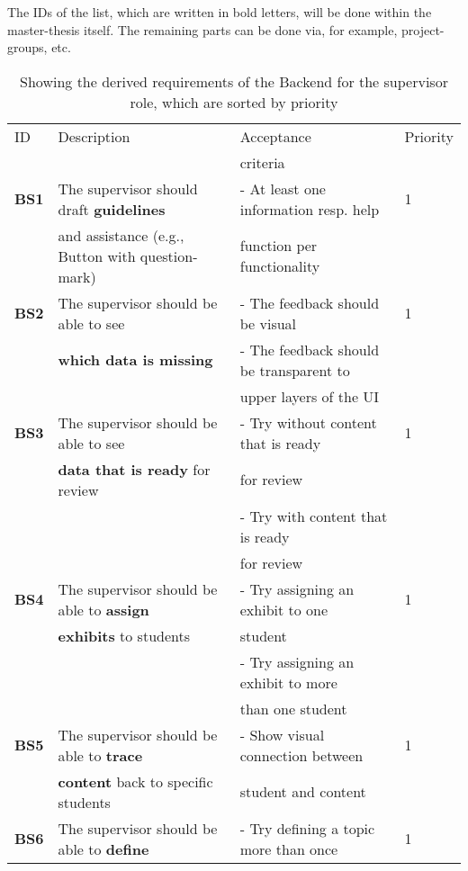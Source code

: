 \documentclass[twoside,openright,fleqn,pointlessnumbers,headinclude,,11pt,a4paper,BCOR5mm,footinclude,cleardoubleempty,abstracton %
                ]{scrreprt}
\begin{document}
The IDs of the list, which are written in bold letters, will be done within the master-thesis itself. The remaining parts can be done via, for example,
project-groups, etc. 

	\begin{table}[h]
		\caption{Showing the derived requirements of the Backend for the supervisor role, which are sorted by priority}
	\begin{tabular}{llll}
	\hline
	ID 	& Description 	& Acceptance 	& Priority \\
	 	& 			 & criteria 	&  \\
		\hline
	\textbf{BS1} 	& The supervisor should draft \textbf{guidelines} 		& - At least one information resp. help 	& 1	\\
	 		& and assistance (e.g., Button with question-mark)		& function per functionality 			& 		\\
	\hline
	\textbf{BS2} 	& The supervisor should be able to see 				&  - The feedback should be visual	& 1	\\
	 	& \textbf{which data is missing} 					&  - The feedback should be transparent to	& 	\\
		& 											& upper layers of the UI & \\
	\hline
	\textbf{BS3} 	& The supervisor should be able to see 				& - Try without content that is ready & 1\\
	 	& \textbf{data that is ready} for review 				&  for review & \\
		&											& - Try with content that is ready		& \\
		&											& for review		& \\
	\hline
	\textbf{BS4} 	& The supervisor should be able to \textbf{assign} 	& - Try assigning an exhibit to one & 1\\
	 	& \textbf{exhibits} to students 					& student  & \\
		&										& - Try assigning an exhibit to more	& \\
		&										&	than one student				& \\
	\hline
	\textbf{BS5} 	& The supervisor should be able to \textbf{trace} 		& - Show visual connection between	& 1\\
	 	& \textbf{content} back to specific students 			&  student and content 	& \\
	\hline
	\textbf{BS6} 	& The supervisor should be able to \textbf{define}  	&  - Try defining a topic more than once	& 1\\

\end{tabular}
\end{table}
\end{document}
